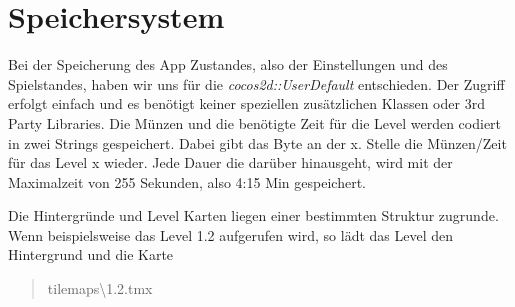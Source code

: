 \section{Speichersystem}\label{sec:Speichersystem}

Bei der Speicherung des App Zustandes, also der Einstellungen und des Spielstandes, haben wir uns für die \textit{cocos2d::UserDefault} entschieden. Der Zugriff erfolgt einfach und es benötigt keiner speziellen zusätzlichen Klassen oder 3rd Party Libraries. Die Münzen und die benötigte Zeit für die Level werden codiert in zwei Strings gespeichert. Dabei gibt das Byte an der x. Stelle die Münzen/Zeit für das Level x wieder. Jede Dauer die darüber hinausgeht, wird mit der Maximalzeit von 255 Sekunden, also 4:15 Min gespeichert.

Die Hintergründe und Level Karten liegen einer bestimmten Struktur zugrunde. Wenn beispielsweise das Level 1.2 aufgerufen wird, so lädt das Level den Hintergrund  und die Karte \blockquote{tilemaps\textbackslash 1.2.tmx}.


